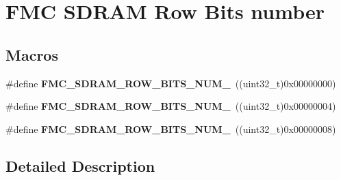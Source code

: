 \hypertarget{group___f_m_c___s_d_r_a_m___row___bits__number}{}\section{F\+MC S\+D\+R\+AM Row Bits number}
\label{group___f_m_c___s_d_r_a_m___row___bits__number}
\subsection*{Macros}
\begin{DoxyCompactItemize}
\item 
\#define {\bfseries F\+M\+C\+\_\+\+S\+D\+R\+A\+M\+\_\+\+R\+O\+W\+\_\+\+B\+I\+T\+S\+\_\+\+N\+U\+M\+\_}~((uint32\+\_\+t)0x00000000)\hypertarget{group___f_m_c___s_d_r_a_m___row___bits__number_ga5c80f75ce6d6c0e68b8e28485490497e}{}\label{group___f_m_c___s_d_r_a_m___row___bits__number_ga5c80f75ce6d6c0e68b8e28485490497e}

\item 
\#define {\bfseries F\+M\+C\+\_\+\+S\+D\+R\+A\+M\+\_\+\+R\+O\+W\+\_\+\+B\+I\+T\+S\+\_\+\+N\+U\+M\+\_}~((uint32\+\_\+t)0x00000004)\hypertarget{group___f_m_c___s_d_r_a_m___row___bits__number_ga52c8df2a362f49cf52c215af794e5215}{}\label{group___f_m_c___s_d_r_a_m___row___bits__number_ga52c8df2a362f49cf52c215af794e5215}

\item 
\#define {\bfseries F\+M\+C\+\_\+\+S\+D\+R\+A\+M\+\_\+\+R\+O\+W\+\_\+\+B\+I\+T\+S\+\_\+\+N\+U\+M\+\_}~((uint32\+\_\+t)0x00000008)\hypertarget{group___f_m_c___s_d_r_a_m___row___bits__number_gab254c8d54ab0702f69db399465f060b5}{}\label{group___f_m_c___s_d_r_a_m___row___bits__number_gab254c8d54ab0702f69db399465f060b5}

\end{DoxyCompactItemize}


\subsection{Detailed Description}
